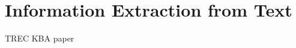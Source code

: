 \chapter{Information Extraction from Text}
\label{chapter:Information Extraction from Text}

TREC KBA paper
